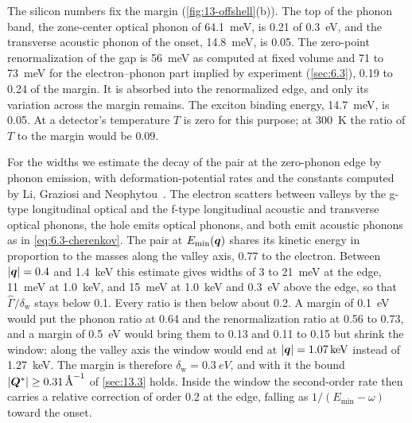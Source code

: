 The silicon numbers fix the margin (\cref{fig:13-offshell}(b)). The top of the phonon band, the zone-center optical phonon of \SI{64.1}{meV}, is 0.21 of \SI{0.3}{eV}, and the transverse acoustic phonon of the onset, \SI{14.8}{meV}, is 0.05. The zero-point renormalization of the gap is \SI{56}{meV} as computed at fixed volume and 71 to \SI{73}{meV} for the electron--phonon part implied by experiment (\cref{sec:6.3}), 0.19 to 0.24 of the margin. It is absorbed into the renormalized edge, and only its variation across the margin remains. The exciton binding energy, \SI{14.7}{meV}, is 0.05. At a detector's temperature $T$ is zero for this purpose; at \SI{300}{K} the ratio of $T$ to the margin would be 0.09.

For the widths we estimate the decay of the pair at the zero-phonon edge by phonon emission, with deformation-potential rates and the constants computed by Li, Graziosi and Neophytou~\cite[Table~III and Eq.~(10)]{li2021deformation}. The electron scatters between valleys by the g-type longitudinal optical and the f-type longitudinal acoustic and transverse optical phonons, the hole emits optical phonons, and both emit acoustic phonons as in \cref{eq:6.3-cherenkov}. The pair at $E_{\mathrm{min}}(\bm{q})$ shares its kinetic energy in proportion to the masses along the valley axis, 0.77 to the electron. Between $|\bm{q}| = 0.4$ and \SI{1.4}{keV} this estimate gives widths of 3 to \SI{21}{meV} at the edge, \SI{11}{meV} at \SI{1.0}{keV}, and \SI{15}{meV} at \SI{1.0}{keV} and \SI{0.3}{eV} above the edge, so that $\hat\varGamma/\delta_{\mathrm{w}}$ stays below 0.1. Every ratio is then below about 0.2. A margin of \SI{0.1}{eV} would put the phonon ratio at 0.64 and the renormalization ratio at 0.56 to 0.73, and a margin of \SI{0.5}{eV} would bring them to 0.13 and 0.11 to 0.15 but shrink the window: along the valley axis the window would end at $|\bm{q}| = \SI{1.07}{keV}$ instead of \SI{1.27}{keV}. The margin is therefore $\delta_{\mathrm{w}} = \SI{0.3}{eV}$, and with it the bound $|\bm{Q}^*| \ge \SI{0.31}{\angstrom^{-1}}$ of \cref{sec:13.3} holds. Inside the window the second-order rate then carries a relative correction of order 0.2 at the edge, falling as $1/(E_{\mathrm{min}} - \omega)$ toward the onset.

